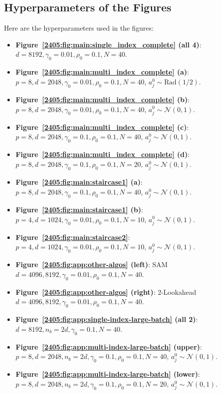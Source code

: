 \subsection{Hyperparameters of the Figures}
Here are the hyperparameters used in the figures:
\begin{itemize}
    \item \textbf{Figure~\ref{2405:fig:main:single_index_complete} (all 4)}: \(d=8192, \gamma_0=0.01, \rho_0 = 0.1, N=40\).
    \item \textbf{Figure~\ref{2405:fig:main:multi_index_complete} (a)}: \(p=8, d=2048, \gamma_0=0.01, \rho_0 = 0.1, N=40\), \(a^0_j\sim \mathrm{Rad}(1/2)\).
    \item \textbf{Figure~\ref{2405:fig:main:multi_index_complete} (b)}: \(p=8, d=2048, \gamma_0=0.01, \rho_0 = 0.1, N=40\), \(a^0_j\sim \mathcal{N}(0,1)\).
    \item \textbf{Figure~\ref{2405:fig:main:multi_index_complete} (c)}: \(p=8, d=2048, \gamma_0=0.1, \rho_0 = 0.1, N=40\), \(a^0_j\sim \mathcal{N}(0,1)\).
    \item \textbf{Figure~\ref{2405:fig:main:multi_index_complete} (d)}: \(p=8, d=2048, \gamma_0=0.1, \rho_0 = 0.1, N=20\), \(a^0_j\sim \mathcal{N}(0,1)\).
    \item \textbf{Figure~\ref{2405:fig:main:staircase1} (a)}: \(p=8, d=2048, \gamma_0=0.1, \rho_0 = 0.1, N=40\), \(a^0_j\sim \mathcal{N}(0,1)\).
    \item \textbf{Figure~\ref{2405:fig:main:staircase1} (b)}: \(p=4, d=1024, \gamma_0=0.01, \rho_0 = 0.1, N=10\), \(a^0_j\sim \mathcal{N}(0,1)\).
     \item \textbf{Figure~\ref{2405:fig:main:staircase2}}: \(p=4, d=1024, \gamma_0=0.01, \rho_0 = 0.1, N=10\), \(a^0_j\sim \mathcal{N}(0,1)\).
    
    \item \textbf{Figure~\ref{2405:fig:app:other-algos} (left)}: SAM \(d=4096,8192, \gamma_0=0.01, \rho_0 = 0.1, N=40\).
    \item \textbf{Figure~\ref{2405:fig:app:other-algos} (right)}: 2-Lookahead \(d=4096,8192, \gamma_0=0.01, \rho_0 = 0.1, N=40\).
    \item \textbf{Figure~\ref{2405:fig:app:single-index-large-batch} (all 2)}: \(d=8192,  n_b=2d, \gamma_0=0.1, N=40\).
    \item \textbf{Figure~\ref{2405:fig:app:multi-index-large-batch} (upper)}: \(p=8, d=2048, n_b=2d, \gamma_0=0.1, \rho_0 = 0.1, N=40\), \(a^0_j\sim \mathcal{N}(0,1)\).
    \item \textbf{Figure~\ref{2405:fig:app:multi-index-large-batch} (lower)}: \(p=8, d=2048, n_b=2d, \gamma_0=0.1, \rho_0 = 0.1, N=20\), \(a^0_j\sim \mathcal{N}(0,1)\).
\end{itemize}
